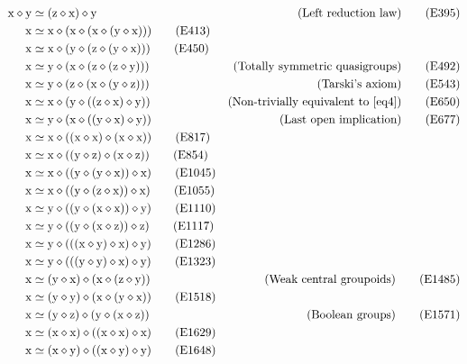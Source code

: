 \documentclass[12pt]{amsart}
\theoremstyle{definition}
\newcommand{\x}{\mathrm{x}}
\newcommand{\y}{\mathrm{y}}
\newcommand{\z}{\mathrm{z}}
\newcommand{\op}{\diamond}
\newcommand{\formaleq}{\simeq}
\begin{document}
\begin{align}
    \x \op \y &\formaleq (\z \op \x) \op \y & \hbox{(Left reduction law)} \label{eq395}\tag{E395} \\
    \x &\formaleq \x \op (\x \op (\x \op (\y \op \x))) \label{eq413}\tag{E413} \\
    \x &\formaleq \x \op (\y \op (\z \op (\y \op \x))) \label{eq450}\tag{E450} \\
    \x &\formaleq \y \op (\x \op (\z \op (\z \op \y))) & \hbox{(Totally symmetric quasigroups)} \label{eq492}\tag{E492} \\
    \x &\formaleq \y \op (\z \op (\x \op (\y \op \z))) & \hbox{(Tarski's axiom)} \label{eq543}\tag{E543} \\
    \x &\formaleq \x \op (\y \op ((\z \op \x) \op \y)) & \hbox{(Non-trivially equivalent to~\eqref{eq4})} \label{eq650}\tag{E650} \\
    \x &\formaleq \y \op (\x \op ((\y \op \x) \op \y)) & \hbox{(Last open implication)} \label{eq677}\tag{E677} \\
    \x &\formaleq \x \op ((\x \op \x) \op (\x \op \x)) \label{eq817}\tag{E817} \\
    \x &\formaleq \x \op ((\y \op \z) \op (\x \op \z)) \label{eq854}\tag{E854}\\
    \x &\formaleq \x \op ((\y \op (\y \op \x)) \op \x) \label{eq1045}\tag{E1045} \\
    \x &\formaleq \x \op ((\y \op (\z \op \x)) \op \x) \label{eq1055}\tag{E1055} \\
    \x &\formaleq \y \op ((\y \op (\x \op \x)) \op \y) \label{eq1110}\tag{E1110} \\
    \x &\formaleq \y \op ((\y \op (\x \op \z)) \op \z) \label{eq1117}\tag{E1117} \\
    \x &\formaleq \y \op (((\x \op \y) \op \x) \op \y) \label{eq1286}\tag{E1286} \\
    \x &\formaleq \y \op (((\y \op \y) \op \x) \op \y) \label{eq1323}\tag{E1323} \\
    \x &\formaleq (\y \op \x) \op (\x \op (\z \op \y)) & \hbox{(Weak central groupoids)}\label{eq1485}\tag{E1485} \\
    \x &\formaleq (\y \op \y) \op (\x \op (\y \op \x)) \label{eq1518}\tag{E1518} \\
    \x &\formaleq (\y \op \z) \op (\y \op (\x \op \z)) & \hbox{(Boolean groups)} \label{eq1571}\tag{E1571} \\
    \x &\formaleq (\x \op \x) \op ((\x \op \x) \op \x) \label{eq1629}\tag{E1629} \\
    \x &\formaleq (\x \op \y) \op ((\x \op \y) \op \y) \label{eq1648}\tag{E1648} \\

\end{align}
\end{document}
